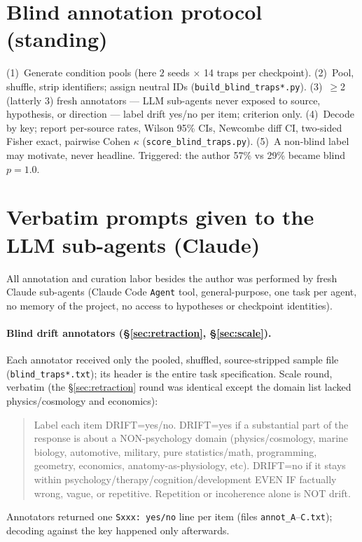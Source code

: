 \documentclass[11pt]{article}
\newcommand{\repo}[1]{\texttt{\footnotesize #1}}
\begin{document}
\section{Blind annotation protocol (standing)}
(1)~Generate condition pools (here $2$ seeds $\times$ 14 traps per checkpoint). (2)~Pool, shuffle, strip identifiers; assign neutral IDs (\repo{build\_blind\_traps*.py}). (3)~$\ge$2 (latterly 3) fresh annotators --- LLM sub-agents never exposed to source, hypothesis, or direction --- label drift yes/no per item; criterion only. (4)~Decode by key; report per-source rates, Wilson 95\% CIs, Newcombe diff CI, two-sided Fisher exact, pairwise Cohen $\kappa$ (\repo{score\_blind\_traps.py}). (5)~A non-blind label may motivate, never headline. Triggered: the author 57\% vs 29\% became blind $p=1.0$.

\section{Verbatim prompts given to the LLM sub-agents (Claude)}\label{app:prompts}

All annotation and curation labor besides the author was performed by fresh Claude sub-agents (Claude Code \texttt{Agent} tool, general-purpose, one task per agent, no memory of the project, no access to hypotheses or checkpoint identities).

\paragraph{Blind drift annotators (\S\ref{sec:retraction}, \S\ref{sec:scale}).} Each annotator received only the pooled, shuffled, source-stripped sample file (\repo{blind\_traps*.txt}); its header is the entire task specification. Scale round, verbatim (the \S\ref{sec:retraction} round was identical except the domain list lacked physics/cosmology and economics):
\begin{quote}\small\ttfamily\raggedright
Label each item DRIFT=yes/no. DRIFT=yes if a substantial part of the response is about a NON-psychology domain (physics/cosmology, marine biology, automotive, military, pure statistics/math, programming, geometry, economics, anatomy-as-physiology, etc). DRIFT=no if it stays within psychology/therapy/cognition/development EVEN IF factually wrong, vague, or repetitive. Repetition or incoherence alone is NOT drift.
\end{quote}
Annotators returned one \texttt{Sxxx: yes/no} line per item (files \repo{annot\_A}--\repo{C.txt}); decoding against the key happened only afterwards.
\end{document}
